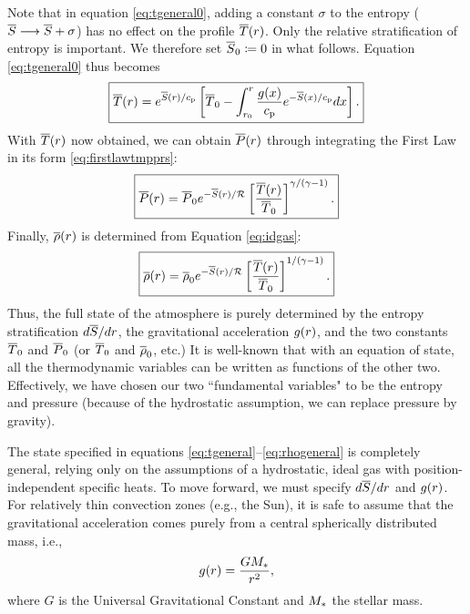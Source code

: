 \documentclass[12pt]{article}
\numberwithin{equation}{section}
\begin{document}
	Note that in equation \eqref{eq:tgeneral0}, adding a constant $\sigma$ to the entropy ($\overline{S}\longrightarrow \overline{S}+\sigma$) has no effect on the profile $\overline{T}(r)$. Only the relative stratification of entropy is important. We therefore set $\overline{S}_0\coloneqq0$ in what follows. Equation \eqref{eq:tgeneral0} thus becomes
		\begin{align}
		\boxed{
			\overline{T}(r) = e^{\overline{S}(r)/c_{\rm{p}}}\left[\overline{T}_0-\int_{r_0}^r \frac{g(x)}{c_{\rm{p}}}e^{-\overline{S}(x)/c_{\rm{p}}}dx \right].
			\label{eq:tgeneral}}
	\end{align}
	With $\overline{T}(r)$ now obtained, we can obtain $\overline{P}(r)$ through integrating the First Law in its form \eqref{eq:firstlawtmpprs}:
	\begin{align}
	\boxed{
	\overline{P}(r)=\overline{P}_0e^{-\overline{S}(r)/\mathcal{R}} \left[\frac{\overline{T}(r)}{\overline{T}_0}\right]^{\gamma/(\gamma - 1)}.
}
\label{eq:pgeneral}
	\end{align}
	Finally, $\overline{\rho}(r)$ is determined from Equation \eqref{eq:idgas}:
	\begin{align}
	\boxed{
	\overline{\rho}(r)=\overline{\rho}_0e^{-\overline{S}(r)/\mathcal{R}} \left[\frac{\overline{T}(r)}{\overline{T}_0}\right]^{1/(\gamma - 1)}.
}
\label{eq:rhogeneral}
	\end{align}
	Thus, the full state of the atmosphere is purely determined by the entropy stratification $d\overline{S}/dr$, the gravitational acceleration $g(r)$, and the two constants $\overline{T}_0$ and $\overline{P}_0$ (or $\overline{T}_0$ and $\overline{\rho}_0$, etc.) It is well-known that with an equation of state, all the thermodynamic variables can be written as functions of the other two. Effectively, we have chosen our two ``fundamental variables" to be the entropy and pressure (because of the hydrostatic assumption, we can replace pressure by gravity). 
	
	The state specified in equations \eqref{eq:tgeneral}--\eqref{eq:rhogeneral} is completely general, relying only on the assumptions of a hydrostatic, ideal gas with position-independent specific heats. To move forward, we must specify $d\overline{S}/dr$ and $g(r)$. For relatively thin convection zones (e.g., the Sun), it is safe to assume that the gravitational acceleration comes purely from a central spherically distributed mass, i.e., 
	\begin{align}
	g(r)=\frac{GM_*}{r^2},
	\label{eq:gpointmass}
	\end{align}
	where $G$ is the Universal Gravitational Constant and $M_*$ the stellar mass. 
\end{document}
